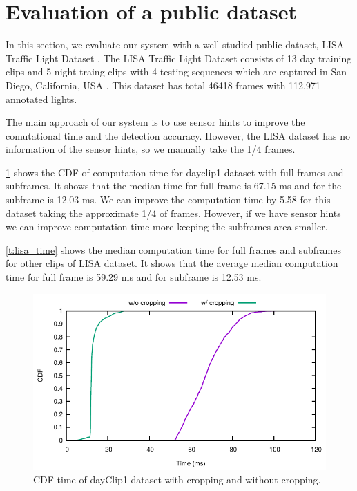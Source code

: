 \section{Evaluation of a public dataset}

In this section, we evaluate our system with a well studied public dataset, LISA Traffic Light Dataset \cite{lisa}.
The LISA Traffic Light Dataset consists of 13 day training clips and 5 night traing clips with 4 testing sequences which are captured in San Diego, California, USA \cite{lisa2}.
This dataset has total 46418 frames with 112,971 annotated lights.

The main approach of our system is to use sensor hints to improve the comutational time and the detection accuracy.
However, the LISA dataset has no information of the sensor hints, so we manually take the 1/4 frames.

\ref{f:lisa_cdf} shows the CDF of computation time for dayclip1 dataset with full frames and subframes.
It shows that the median time for full frame is 67.15 ms and for the subframe is 12.03 ms.
We can improve the computation time by 5.58 for this dataset taking the approximate 1/4 of frames.
However, if we have sensor hints we can improve computation time more keeping the subframes area smaller.

\ref{t:lisa_time} shows the median computation time for full frames and subframes for other clips of LISA dataset.
It shows that the average median computation time for full frame is 59.29 ms and for subframe is 12.53 ms.


\begin{figure}[ht!]
  \centering
  \includegraphics[width=5.2in]{plots/lisaday1_cdf.pdf}
  \caption{CDF time of dayClip1 dataset with cropping and without cropping.}
  \label{f:lisa_cdf}
\end{figure}

